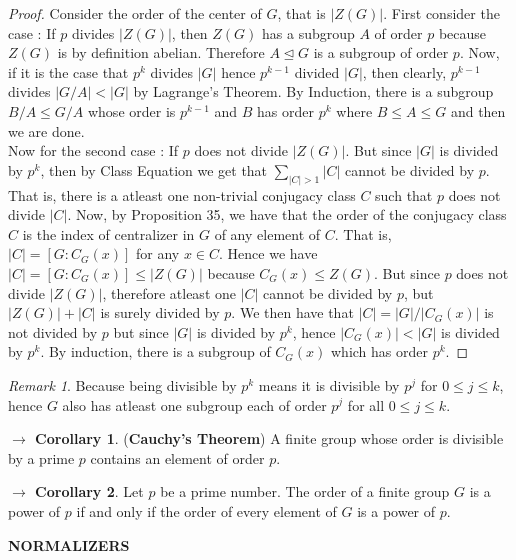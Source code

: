 \documentclass{article}
\theoremstyle{definition}
\theoremstyle{remark}
\newtheorem*{remark}{Remark}
\theoremstyle{definition}
\newtheorem{corollary}{$ \to $ Corollary}
\theoremstyle{definition}
\theoremstyle{definition}
\theoremstyle{proof}
\newcommand{\order}[1]{\left\vert #1 \right\vert}
\newcommand{\nsg}[0]{\trianglelefteq}
\begin{document}
\begin{proof}
Consider the order of the center of $ G $, that is $ \order{Z(G)} $. First consider the case : If $ p $ divides $ \order{Z(G)} $, then $ Z(G) $ has a subgroup $ A $ of order $ p $ because $ Z(G) $ is by definition abelian. Therefore $ A \nsg G$ is a subgroup of order $ p $. Now, if it is the case that $ p^k $ divides $ \order{G} $ hence $ p^{k-1} $ divided $ \order{G} $, then clearly, $ p^{k-1} $ divides $ \order{G/A} <\order{G} $ by Lagrange's Theorem. By Induction, there is a  subgroup $ B/A \le G/A$ whose order is $ p^{k-1} $ and $ B $ has order $ p^k $ where $ B\le A\le G $ and then we are done.\\
Now for the second case : If $ p $ does not divide $ \order{Z(G)} $. But since $ \order{G} $ is divided by $ p^k $, then by Class Equation we get that $ \sum_{\order{C}>1} \order{C}$ cannot be divided by $ p $. That is, there is a atleast one non-trivial conjugacy class $ C $ such that $ p $ does not divide $ \order{C} $. Now, by Proposition 35, we have that the order of the conjugacy class $ C $ is the index of centralizer in $ G $ of any element of $ C $. That is, $ \order{C} = [G:C_G(x)] $ for any $ x\in C $. Hence we have $ \order{C} = [G:C_G(x)] \le \order{Z(G)} $ because $ C_G(x) \le Z(G)$. But since $ p $ does not divide $ \order{Z(G)} $, therefore atleast one $ \order{C} $ cannot be divided by $ p $, but $ \order{Z(G)} + \order{C} $ is surely divided by $ p $. We then have that $ \order{C} = \order{G} / \order{C_G(x)}$ is not divided by $ p $ but since $ \order{G} $ is divided by $ p^k $, hence $ \order{C_G(x)} < \order{G} $ is divided by $ p^k $. By induction, there is a subgroup of $ C_G(x) $ which has order $ p^k $.
\end{proof}
\begin{remark}
	Because being divisible by $ p^k $ means it is divisible by $ p^j $ for $ 0\le j\le k $, hence $ G $ also has atleast one subgroup each of order $ p^j $ for all $0 \le j \le k$.
\end{remark}
\hrulefill
\begin{corollary}
	(\textbf{Cauchy's Theorem}) A finite group whose order is divisible by a prime $ p $ contains an element of order $ p $.
\end{corollary}
\begin{corollary}
	Let $ p $ be a prime number. The order of a finite group $ G $ is a power of $ p $ if and only if the order of every element of $ G $ is a power of $ p $.
\end{corollary}
\hrulefill
\textbf{NORMALIZERS}
\hrulefill
\end{document}
